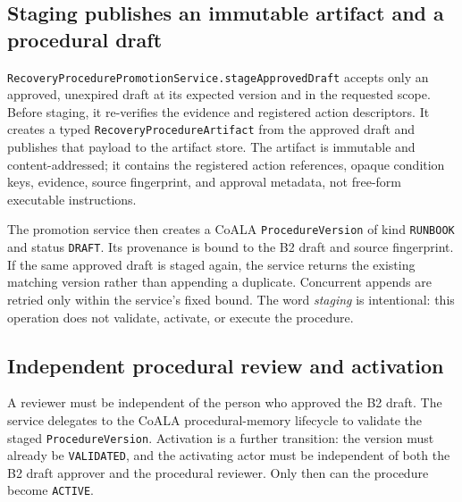 \subsection{Staging publishes an immutable artifact and a procedural draft}
\label{subsec:ch22-staging}

\texttt{Recovery\allowbreak Procedure\allowbreak Promotion\allowbreak Service.\allowbreak stage\allowbreak Approved\allowbreak Draft} accepts only an approved, unexpired draft at its expected version and in the requested scope. Before staging, it re-verifies the evidence and registered action descriptors. It creates a typed \texttt{Recovery\allowbreak Procedure\allowbreak Artifact} from the approved draft and publishes that payload to the artifact store. The artifact is immutable and content-addressed; it contains the registered action references, opaque condition keys, evidence, source fingerprint, and approval metadata, not free-form executable instructions.

The promotion service then creates a CoALA \texttt{Procedure\allowbreak Version} of kind \texttt{RUNBOOK} and status \texttt{DRAFT}. Its provenance is bound to the B2 draft and source fingerprint. If the same approved draft is staged again, the service returns the existing matching version rather than appending a duplicate. Concurrent appends are retried only within the service's fixed bound. The word \emph{staging} is intentional: this operation does not validate, activate, or execute the procedure.

\subsection{Independent procedural review and activation}
\label{subsec:ch22-procedure-activation}

A reviewer must be independent of the person who approved the B2 draft. The service delegates to the CoALA procedural-memory lifecycle to validate the staged \texttt{Procedure\allowbreak Version}. Activation is a further transition: the version must already be \texttt{VALIDATED}, and the activating actor must be independent of both the B2 draft approver and the procedural reviewer. Only then can the procedure become \texttt{ACTIVE}.

